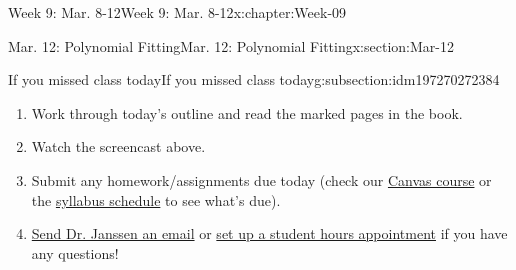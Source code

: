 \documentclass[oneside,10pt,]{book}
\numberwithin{equation}{section}
\begin{document}
\begin{chapterptx}{Week 9: Mar. 8-12}{}{Week 9: Mar. 8-12}{}{}{x:chapter:Week-09}
\begin{sectionptx}{Mar. 12: Polynomial Fitting}{}{Mar. 12: Polynomial Fitting}{}{}{x:section:Mar-12}
\begin{subsectionptx}{If you missed class today}{}{If you missed class today}{}{}{g:subsection:idm197270272384}
%
\begin{enumerate}
\item{}Work through today's outline and read the marked pages in the book.%
\item{}Watch the screencast above.%
\item{}Submit any homework\slash{}assignments due today (check our \href{https://dordt.instructure.com/courses/3110050}{Canvas course} or the \href{https://prof.mkjanssen.org/ds/index.html\#schedule}{syllabus schedule} to see what's due).%
\item{}\href{mailto:mike.janssen@dordt.edu}{Send Dr. Janssen an email} or \href{https://calendly.com/mkjanssen/student-hours}{set up a student hours appointment} if you have any questions!%
\end{enumerate}
\end{subsectionptx}
\end{sectionptx}
\end{chapterptx}
%
%
\typeout{************************************************}
\typeout{************************************************}
%
\end{document}
